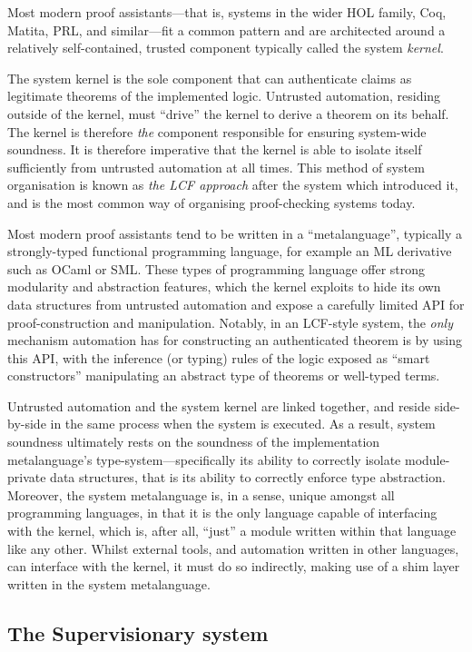 \documentclass[a4paper, UKenglish, cleveref, autoref, thm-restate]{lipics-v2021}
\begin{document}
Most modern proof assistants---that is, systems in the wider HOL family, Coq, Matita, PRL, and similar---fit a common pattern and are architected around a relatively self-contained, trusted component typically called the system \emph{kernel}.

The system kernel is the sole component that can authenticate claims as legitimate theorems of the implemented logic.
Untrusted automation, residing outside of the kernel, must ``drive'' the kernel to derive a theorem on its behalf.
The kernel is therefore \emph{the} component responsible for ensuring system-wide soundness.
It is therefore imperative that the kernel is able to isolate itself sufficiently from untrusted automation at all times.
This method of system organisation is known as \emph{the LCF approach} after the system which introduced it, and is the most common way of organising proof-checking systems today.

Most modern proof assistants tend to be written in a ``metalanguage'', typically a strongly-typed functional programming language, for example an ML derivative such as OCaml or SML.
These types of programming language offer strong modularity and abstraction features, which the kernel exploits to hide its own data structures from untrusted automation and expose a carefully limited API for proof-construction and manipulation.
Notably, in an LCF-style system, the \emph{only} mechanism automation has for constructing an authenticated theorem is by using this API, with the inference (or typing) rules of the logic exposed as ``smart constructors'' manipulating an abstract type of theorems or well-typed terms.

Untrusted automation and the system kernel are linked together, and reside side-by-side in the same process when the system is executed.
As a result, system soundness ultimately rests on the soundness of the implementation metalanguage's type-system---specifically its ability to correctly isolate module-private data structures, that is its ability to correctly enforce type abstraction.
Moreover, the system metalanguage is, in a sense, unique amongst all programming languages, in that it is the only language capable of interfacing with the kernel, which is, after all, ``just'' a module written within that language like any other.
Whilst external tools, and automation written in other languages, can interface with the kernel, it must do so indirectly, making use of a shim layer written in the system metalanguage.

\subsection{The Supervisionary system}
\end{document}
